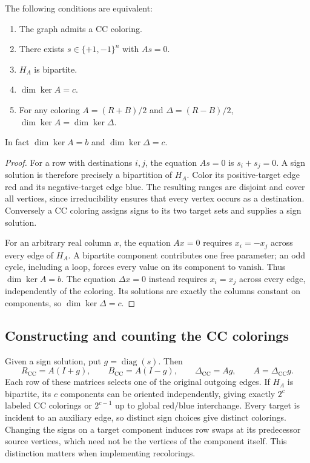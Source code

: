 \begin{theorem}\label{cc-exist:equivalences}
The following conditions are equivalent:
\begin{enumerate}
\item The graph admits a CC coloring.
\item There exists $s\in\{+1,-1\}^n$ with $As=0$.
\item $H_A$ is bipartite.
\item $\dim\ker A=c$.
\item For any coloring $A=(R+B)/2$ and $\Delta=(R-B)/2$,
$\dim\ker A=\dim\ker\Delta$.
\end{enumerate}
In fact $\dim\ker A=b$ and $\dim\ker\Delta=c$.
\end{theorem}
\begin{proof}
For a row with destinations $i,j$, the equation $As=0$ is
$s_i+s_j=0$. A sign solution is therefore precisely a bipartition of $H_A$.
Color its positive-target edge red and its negative-target edge blue.
The resulting ranges are disjoint and cover all vertices, since irreducibility
ensures that every vertex occurs as a destination. Conversely a CC coloring
assigns signs to its two target sets and supplies a sign solution.

For an arbitrary real column $x$, the equation $Ax=0$ requires
$x_i=-x_j$ across every edge of $H_A$. A bipartite component contributes
one free parameter; an odd cycle, including a loop, forces every value
on its component to vanish. Thus $\dim\ker A=b$.
The equation $\Delta x=0$ instead requires $x_i=x_j$ across every edge,
independently of the coloring. Its solutions are exactly the columns
constant on components, so $\dim\ker\Delta=c$.
\end{proof}

\subsection{Constructing and counting the CC colorings}
Given a sign solution, put $g=\operatorname{diag}(s)$. Then
\[
 R_{\mathrm{CC}}=A(I+g),\qquad B_{\mathrm{CC}}=A(I-g),
 \qquad \Delta_{\mathrm{CC}}=Ag,
 \qquad A=\Delta_{\mathrm{CC}}g.
\]
Each row of these matrices selects one of the original outgoing edges.
If $H_A$ is bipartite, its $c$ components can be oriented independently,
giving exactly $2^c$ labeled CC colorings or $2^{c-1}$ up to global
red/blue interchange. Every target is incident to an auxiliary edge,
so distinct sign choices give distinct colorings.
Changing the signs on a target component induces row swaps at its
predecessor source vertices, which need not be the vertices of the
component itself. This distinction matters when implementing recolorings.

